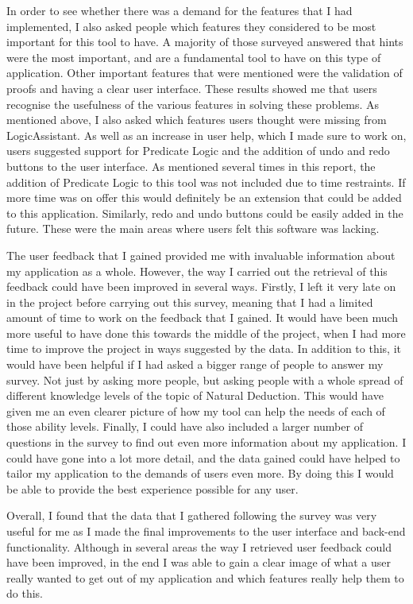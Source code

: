 In order to see whether there was a demand for the features that I had implemented, I also asked people which features they considered to be most important for this tool to have. A majority of those surveyed answered that hints were the most important, and are a fundamental tool to have on this type of application. Other important features that were mentioned were the validation of proofs and having a clear user interface. These results showed me that users recognise the usefulness of the various features in solving these problems. As mentioned above, I also asked which features users thought were missing from LogicAssistant. As well as an increase in user help, which I made sure to work on, users suggested support for Predicate Logic and the addition of undo and redo buttons to the user interface. As mentioned several times in this report, the addition of Predicate Logic to this tool was not included due to time restraints. If more time was on offer this would definitely be an extension that could be added to this application. Similarly, redo and undo buttons could be easily added in the future. These were the main areas where users felt this software was lacking.

The user feedback that I gained provided me with invaluable information about my application as a whole. However, the way I carried out the retrieval of this feedback could have been improved in several ways. Firstly, I left it very late on in the project before carrying out this survey, meaning that I had a limited amount of time to work on the feedback that I gained. It would have been much more useful to have done this towards the middle of the project, when I had more time to improve the project in ways suggested by the data. In addition to this, it would have been helpful if I had asked a bigger range of people to answer my survey. Not just by asking more people, but asking people with a whole spread of different knowledge levels of the topic of Natural Deduction. This would have given me an even clearer picture of how my tool can help the needs of each of those ability levels. Finally, I could have also included a larger number of questions in the survey to find out even more information about my application. I could have gone into a lot more detail, and the data gained could have helped to tailor my application to the demands of users even more. By doing this I would be able to provide the best experience possible for any user.

Overall, I found that the data that I gathered following the survey was very useful for me as I made the final improvements to the user interface and back-end functionality. Although in several areas the way I retrieved user feedback could have been improved, in the end I was able to gain a clear image of what a user really wanted to get out of my application and which features really help them to do this. 


